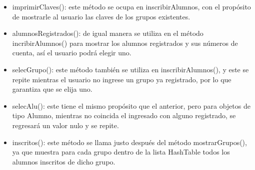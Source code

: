 \documentclass[12pt]{report}
\begin{document}
\begin{itemize}
\begin{itemize}
\newpage
\item imprimirClaves(): este método se ocupa en inscribirAlumnos, con el propósito de mostrarle al usuario las claves de los grupos existentes.
\item alumnosRegistrados(): de igual manera se utiliza en el método incribirAlumnos() para mostrar los alumnos registrados y sus números de cuenta, así el usuario podrá elegir uno.
\item selecGrupo(): este método también se utiliza en inscribirAlumnos(), y este se repite mientras el usuario no ingrese un grupo ya registrado, por lo que garantiza que se elija uno.
\item selecAlu(): este tiene el mismo propósito que el anterior, pero para objetos de tipo Alumno, mientras no coincida el ingresado con alguno registrado, se regresará un valor nulo y se repite.
\item inscritos(): este método se llama justo después del método mostrarGrupos(), ya que muestra para cada grupo dentro de la lista HashTable todos los alumnos inscritos de dicho grupo.

\end{itemize}








\end{itemize}
\end{document}
